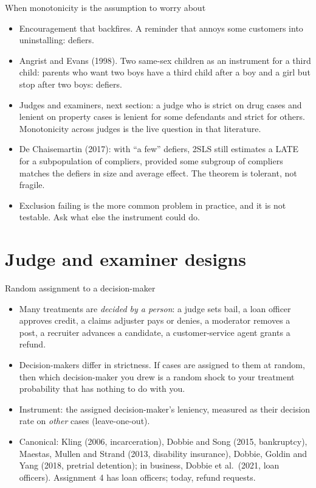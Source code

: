 \documentclass[aspectratio=169,11pt]{beamer}
\begin{document}
\begin{frame}{When monotonicity is the assumption to worry about}
\begin{itemize}
	\item \alert{Encouragement that backfires.} A reminder that annoys some customers into uninstalling: defiers.
	\medskip
	\item \alert{Angrist and Evans (1998).} Two same-sex children as an instrument for a third child: parents who
	want two boys have a third child after a boy and a girl but stop after two boys: defiers.
	\medskip
	\item \alert{Judges and examiners}, next section: a judge who is strict on drug cases and lenient on
	property cases is lenient for some defendants and strict for others. Monotonicity across judges is the
	live question in that literature.
	\medskip
	\item De Chaisemartin (2017): with ``a few'' defiers, 2SLS still estimates a LATE for a
	subpopulation of compliers, provided some subgroup of compliers matches the defiers in size and average effect. The theorem is
	tolerant, not fragile.
	\medskip
	\item Exclusion failing is the more common problem in practice, and it is not testable. Ask what else the
	instrument could do.
\end{itemize}
\end{frame}


\section{Judge and examiner designs}

\begin{frame}{Random assignment to a decision-maker}
\begin{itemize}
	\item Many treatments are \emph{decided by a person}: a judge sets bail, a loan officer approves credit,
	a claims adjuster pays or denies, a moderator removes a post, a recruiter advances a candidate, a
	customer-service agent grants a refund.
	\medskip
	\item Decision-makers differ in strictness. If cases are assigned to them \alert{at random}, then which
	decision-maker you drew is a random shock to your treatment probability that has nothing to do with you.
	\medskip
	\item Instrument: the assigned decision-maker's \alert{leniency}, measured as their decision rate on
	\emph{other} cases (leave-one-out).
	\medskip
	\item Canonical: Kling (2006, incarceration), Dobbie and Song (2015, bankruptcy), Maestas, Mullen and
	Strand (2013, disability insurance), Dobbie, Goldin and Yang (2018, pretrial detention); in business,
	Dobbie et al.\ (2021, loan officers). Assignment 4 has loan officers; today, refund requests.
\end{itemize}
\end{frame}
\end{document}
